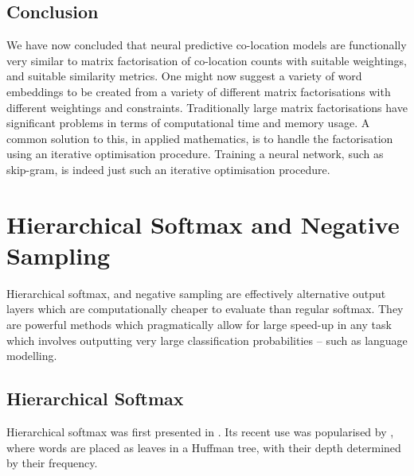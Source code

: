 {\subsection{Conclusion}
We have now concluded that neural predictive co-location models are functionally very similar to matrix factorisation of co-location counts with suitable weightings, and suitable similarity metrics.
One might now suggest a variety of word embeddings to be created from a variety of different matrix factorisations with different weightings and constraints.
Traditionally large matrix factorisations have significant problems in terms of computational time and memory usage.
A common solution to this, in applied mathematics, is to handle the factorisation using an iterative optimisation procedure.
Training a neural network, such as skip-gram, is indeed just such an iterative optimisation procedure.




\section{Hierarchical Softmax and Negative Sampling}\label{sec:hierachical-softmax-and-negative-sampling}
Hierarchical softmax, and negative sampling are effectively alternative output layers which are computationally cheaper to evaluate than regular softmax.
They are powerful methods which pragmatically allow for large speed-up in any task which involves outputting very large classification probabilities -- such as language modelling.


\subsection{Hierarchical Softmax}\label{sec:hierarchical-softmax}
Hierarchical softmax was first presented in  .
Its recent use was popularised by , where words are placed as leaves in a Huffman tree, with their depth determined by their frequency.



}
